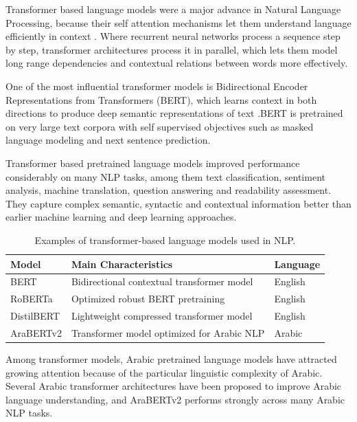 \documentclass[12pt]{report}
\begin{document}
Transformer based language models were a major advance in Natural Language Processing, because their self attention mechanisms let them understand language efficiently in context \cite{vaswani2017attention}. Where recurrent neural networks process a sequence step by step, transformer architectures process it in parallel, which lets them model long range dependencies and contextual relations between words more effectively.

One of the most influential transformer models is Bidirectional Encoder Representations from Transformers (BERT), which learns context in both directions to produce deep semantic representations of text \cite{devlin2019bert}.BERT is pretrained on very large text corpora with self supervised objectives such as masked language modeling and next sentence prediction.

Transformer based pretrained language models improved performance considerably on many NLP tasks, among them text classification, sentiment analysis, machine translation, question answering and readability assessment. They capture complex semantic, syntactic and contextual information better than earlier machine learning and deep learning approaches.
\begin{table}[H]

\centering

\caption{Examples of transformer-based language models used in NLP.}

\label{tab:transformer_models}

\begin{tabular}{p{4cm} p{6.5cm} p{2.5cm}}

\toprule

\textbf{Model} & \textbf{Main Characteristics} & \textbf{Language} \\

\midrule

BERT & Bidirectional contextual transformer model & English \\

RoBERTa & Optimized robust BERT pretraining & English \\

DistilBERT & Lightweight compressed transformer model & English \\

AraBERTv2 & Transformer model optimized for Arabic NLP & Arabic \\

\bottomrule

\end{tabular}

\end{table}
Among transformer models, Arabic pretrained language models have attracted growing attention because of the particular linguistic complexity of Arabic. Several Arabic transformer architectures have been proposed to improve Arabic language understanding, and AraBERTv2 performs strongly across many Arabic NLP tasks.
\end{document}
